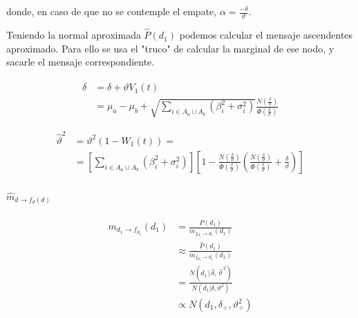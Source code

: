 \documentclass[11pt,twoside,spanish]{report} %
\begin{document}
donde, en caso de que no se contemple el empate, $\alpha=\frac{-\delta}{\vartheta}$.

Teniendo la normal aproximada $\widehat{P}(d_1)$ podemos calcular el mensaje ascendentes aproximado. Para ello se usa el "truco" de calcular la marginal de ese nodo, y sacarle el mensaje correspondiente.

\begin{equation}
	\begin{split}
		\widehat{\delta} &= \delta+\vartheta V_1(t) \\
		& = \mu_{a}-\mu_{b}+\sqrt{\sum_{i\in A_{a}\cup A_{b}}(\beta_i^2+\sigma_i^2)}\frac{N(\frac{\delta}{\vartheta})}{\Phi(\frac{\delta}{\vartheta})}
	\end{split}
\end{equation}

\begin{equation}
	\begin{split}
		\widehat{\vartheta}^2 &= \vartheta^2(1-W_1(t)) = \\
		&=\left[\sum_{i\in A_{a}\cup A_{b}}(\beta_i^2+\sigma_i^2)\right]\left[1-\frac{N(\frac{\delta}{\vartheta})}{\Phi(\frac{\delta}{\vartheta})}\left(\frac{N(\frac{\delta}{\vartheta})}{\Phi(\frac{\delta}{\vartheta})}+ \frac{\delta}{\vartheta}\right)\right]
	\end{split}
\end{equation}

\paragraph{$\widehat{m}_{d \rightarrow f_{d}(d)}$}

\begin{equation}\label{eq:m^_d_fd}
	\begin{split}
		m_{d_1 \rightarrow f_{d_1}}(d_1) &= \frac{P(d_1)}{m_{f_{d_1} \rightarrow d_1}(d_1)} \\
		&\approx \frac{\widehat{P}(d_1)}{m_{f_{d_1} \rightarrow d_1}(d_1)} \\
		& =  \frac{N(d_1 \,  | \,\widehat{\delta} , \, \widehat{\vartheta}^{\,2} )}{N(d_1 | \delta, \vartheta^2)} \\
		&\propto N(d_1,\delta_{\div},\vartheta_{\div}^2 )
	\end{split}
\end{equation}
\end{document}
